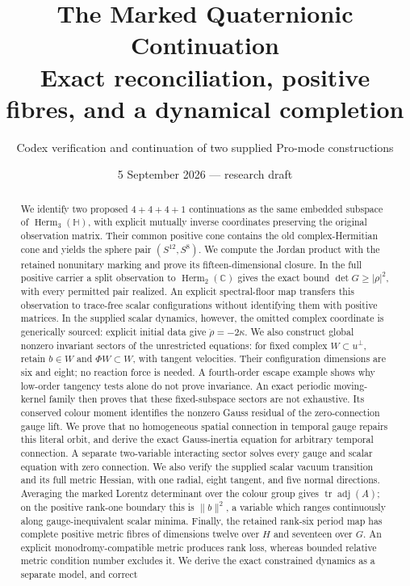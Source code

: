 \documentclass[11pt]{article}
\title{The Marked Quaternionic Continuation\\
\large Exact reconciliation, positive fibres, and a dynamical completion}
\author{Codex verification and continuation of two supplied Pro-mode constructions}
\date{5 September 2026 --- research draft}
\begin{document}
\maketitle
\begin{abstract}
We identify two proposed $4+4+4+1$ continuations as the same embedded
subspace of $\operatorname{Herm}_3(\mathbb H)$, with explicit mutually inverse
coordinates preserving the original observation matrix. Their common
positive cone contains the old complex-Hermitian cone and yields the sphere
pair $(S^{12},S^8)$. We compute the Jordan product with the retained
nonunitary marking and prove its fifteen-dimensional closure. In the
full positive carrier a split observation to $\operatorname{Herm}_2(\mathbb C)$
gives the exact bound $\det G\geq|\rho|^2$, with every permitted pair
realized. An explicit spectral-floor map transfers this observation to
trace-free scalar configurations without identifying them with positive matrices.
In the
supplied scalar dynamics, however, the omitted complex coordinate is
generically sourced: explicit initial data give $\ddot\rho=-2\kappa$.
We also construct global nonzero invariant sectors of the unrestricted
equations: for fixed complex $W\subset u^\perp$, retain $b\in W$ and
$\Phi W\subset W$, with tangent velocities. Their configuration dimensions
are six and eight; no reaction force is needed. A fourth-order escape
example shows why low-order tangency tests alone do not prove invariance.
An exact periodic moving-kernel family then proves that these fixed-subspace
sectors are not exhaustive. Its conserved colour moment identifies the
nonzero Gauss residual of the zero-connection gauge lift. We prove that
no homogeneous spatial connection in temporal gauge repairs this literal
orbit, and derive the exact Gauss-inertia equation for arbitrary temporal
connection. A separate two-variable interacting sector solves every
gauge and scalar equation with zero connection. We also verify
the supplied scalar vacuum transition and its full metric Hessian, with
one radial, eight tangent, and five normal directions. Averaging the
marked Lorentz determinant over the colour group gives
$\operatorname{tr}\operatorname{adj}(A)$; on the positive rank-one
boundary this is $\|b\|^2$, a variable which ranges continuously along
gauge-inequivalent scalar minima. Finally, the retained rank-six period
map has complete positive metric fibres of dimensions twelve over $H$
and seventeen over $G$. An explicit monodromy-compatible metric produces
rank loss, whereas bounded relative metric condition number excludes it.
We derive the exact constrained dynamics as a separate model, and correct

\end{abstract}
\end{document}
